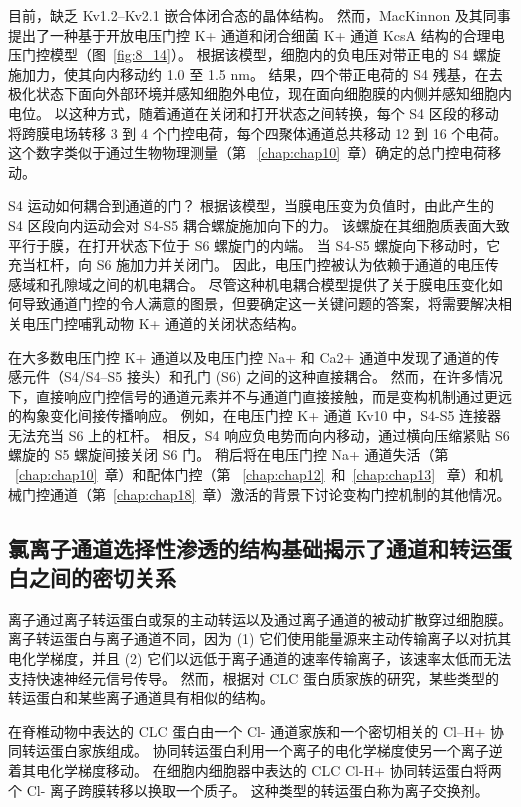 目前，缺乏 Kv1.2–Kv2.1 嵌合体闭合态的晶体结构。 然而，MacKinnon 及其同事提出了一种基于开放电压门控 K+ 通道和闭合细菌 K+ 通道 KcsA 结构的合理电压门控模型（图~\ref{fig:8_14}）。
根据该模型，细胞内的负电压对带正电的 S4 螺旋施加力，使其向内移动约 1.0 至 1.5 nm。
结果，四个带正电荷的 S4 残基，在去极化状态下面向外部环境并感知细胞外电位，现在面向细胞膜的内侧并感知细胞内电位。
以这种方式，随着通道在关闭和打开状态之间转换，每个 S4 区段的移动将跨膜电场转移 3 到 4 个门控电荷，每个四聚体通道总共移动 12 到 16 个电荷。 
这个数字类似于通过生物物理测量（第 ~\ref{chap:chap10}~章）确定的总门控电荷移动。


S4 运动如何耦合到通道的门？
根据该模型，当膜电压变为负值时，由此产生的 S4 区段向内运动会对 S4-S5 耦合螺旋施加向下的力。
该螺旋在其细胞质表面大致平行于膜，在打开状态下位于 S6 螺旋门的内端。
当 S4-S5 螺旋向下移动时，它充当杠杆，向 S6 施加力并关闭门。
因此，电压门控被认为依赖于通道的电压传感域和孔隙域之间的机电耦合。
尽管这种机电耦合模型提供了关于膜电压变化如何导致通道门控的令人满意的图景，但要确定这一关键问题的答案，将需要解决相关电压门控哺乳动物 K+ 通道的关闭状态结构。


在大多数电压门控 K+ 通道以及电压门控 Na+ 和 Ca2+ 通道中发现了通道的传感元件（S4/S4–S5 接头）和孔门 (S6) 之间的这种直接耦合。
然而，在许多情况下，直接响应门控信号的通道元素并不与通道门直接接触，而是变构机制通过更远的构象变化间接传播响应。
例如，在电压门控 K+ 通道 Kv10 中，S4-S5 连接器无法充当 S6 上的杠杆。
相反，S4 响应负电势而向内移动，通过横向压缩紧贴 S6 螺旋的 S5 螺旋间接关闭 S6 门。
稍后将在电压门控 Na+ 通道失活（第 ~\ref{chap:chap10}~章）和配体门控（第 ~\ref{chap:chap12}~和~\ref{chap:chap13}~ 章）和机械门控通道（第~\ref{chap:chap18}~章）激活的背景下讨论变构门控机制的其他情况。



\subsection{氯离子通道选择性渗透的结构基础揭示了通道和转运蛋白之间的密切关系}

离子通过离子转运蛋白或泵的主动转运以及通过离子通道的被动扩散穿过细胞膜。
离子转运蛋白与离子通道不同，因为 (1) 它们使用能量源来主动传输离子以对抗其电化学梯度，并且 (2) 它们以远低于离子通道的速率传输离子，该速率太低而无法支持快速神经元信号传导。
然而，根据对 CLC 蛋白质家族的研究，某些类型的转运蛋白和某些离子通道具有相似的结构。


在脊椎动物中表达的 CLC 蛋白由一个 Cl- 通道家族和一个密切相关的 Cl--H+ 协同转运蛋白家族组成。
协同转运蛋白利用一个离子的电化学梯度使另一个离子逆着其电化学梯度移动。
在细胞内细胞器中表达的 CLC Cl-H+ 协同转运蛋白将两个 Cl- 离子跨膜转移以换取一个质子。
这种类型的转运蛋白称为离子交换剂。


